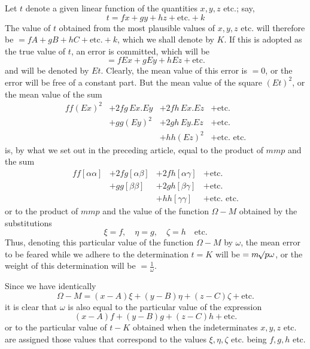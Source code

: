 Let \(t\) denote a given linear function of the quantities \(x,y,z\) etc.; say,
\[
t=fx+gy+hz+\text{etc.}+k
\]
The value of \(t\) obtained from the most plausible values of \(x,y,z\) etc. will therefore be \(=fA+gB+hC+\text{etc.}+k\), which we shall denote by \(K\). If this is adopted as the true value of \(t\), an error is committed, which will be
\[
=fEx+gEy+hEz+\text{etc.}
\]
and will be denoted by \(Et\). Clearly, the mean value of this error is \(=0\), or the error will be free of a constant part. But the mean value of the square \((Et)^2\), or the mean value of the sum
\[
\begin{array}{llll}
ff(Ex)^2&+2fg\,Ex.Ey&+2fh\,Ex.Ez&+\text{etc.}\\
&+gg(Ey)^2&+2gh\,Ey.Ez&+\text{etc.}\\
&&+hh(Ez)^2&+\text{etc. etc.}
\end{array}
\]
is, by what we set out in the preceding article, equal to the product of \(mmp\) and the sum
\[
\begin{array}{llll}
ff[\alpha\alpha]&+2fg[\alpha\beta]&+2fh[\alpha\gamma]&+\text{etc.}\\
&+gg[\beta\beta]&+2gh[\beta\gamma]&+\text{etc.}\\
&&+hh[\gamma\gamma]&+\text{etc. etc.}
\end{array}
\]
or to the product of \(mmp\) and the value of the function \(\Omega-M\) obtained by the substitutions
\[
\xi=f,\quad\eta=g,\quad\zeta=h\quad\text{etc.}
\]
Thus, denoting this particular value of the function \(\Omega-M\) by \(\omega\), the mean error to be feared while we adhere to the determination \(t=K\) will be \(=m\mathord{{}^{}\!\surd}p\omega\), or the weight of this determination will be \(=\frac1\omega\).

Since we have identically
\[
\Omega-M=(x-A)\xi+(y-B)\eta+(z-C)\zeta+\text{etc.}
\]
it is clear that \(\omega\) is also equal to the particular value of the expression
\[
(x-A)f+(y-B)g+(z-C)h+\text{etc.}
\]
or to the particular value of \(t-K\) obtained when the indeterminates \(x,y,z\) etc. are assigned those values that correspond to the values \(\xi,\eta,\zeta\) etc. being \(f,g,h\) etc.

